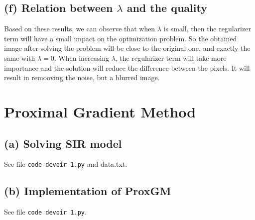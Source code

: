 \documentclass{article}
\begin{document}
\subsection*{(f) Relation between $\lambda$ and the quality}
Based on these results, we can observe that when $\lambda$ is small, then the
regularizer term will have a small impact on the optimization problem. So the
obtained image after solving the problem will be close to the original one, and
exactly the same with $\lambda = 0$. When increasing $\lambda$, the regularizer term
will take more importance and the solution will reduce the difference between the pixels.
It will result in remooving the noise, but a blurred image. 


\section*{Proximal Gradient Method}
\subsection*{(a) Solving SIR model}
See file \texttt{code devoir 1.py} and data.txt. 

\subsection*{(b) Implementation of ProxGM}
See file \texttt{code devoir 1.py}.
\end{document}
